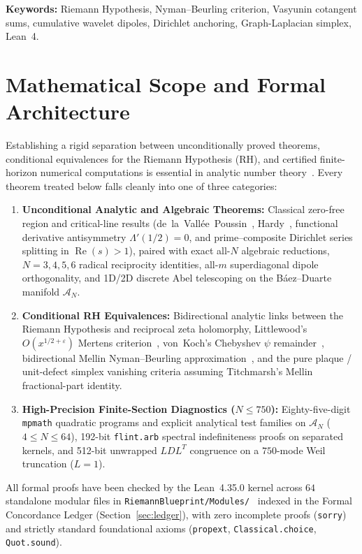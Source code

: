 \documentclass[11pt,a4paper]{article}
\theoremstyle{definition}
\begin{document}
\noindent\textbf{Keywords:} Riemann Hypothesis, Nyman--Beurling criterion, Vasyunin cotangent sums, cumulative wavelet dipoles, Dirichlet anchoring, Graph-Laplacian simplex, Lean~4.

\tableofcontents
\clearpage

\section{Mathematical Scope and Formal Architecture}\label{sec:intro}

Establishing a rigid separation between unconditionally proved theorems, conditional equivalences for the Riemann Hypothesis (RH), and certified finite-horizon numerical computations is essential in analytic number theory~\cite{Riemann1859,Titchmarsh1986}. Every theorem treated below falls cleanly into one of three categories:
\begin{enumerate}[leftmargin=1.8em,itemsep=2pt]
\item \textbf{Unconditional Analytic and Algebraic Theorems:} Classical zero-free region and critical-line results (de~la~Vall\'ee~Poussin~\cite{deLaValleePoussin1899}, Hardy~\cite{Hardy1914}, functional derivative antisymmetry $\Lambda'(1/2)=0$, and prime--composite Dirichlet series splitting in $\operatorname{Re}(s)>1$), paired with exact all-$N$ algebraic reductions, $N=3,4,5,6$ radical reciprocity identities, all-$m$ superdiagonal dipole orthogonality, and 1D/2D discrete Abel telescoping on the B\'aez--Duarte manifold $\mathcal{A}_N$.
\item \textbf{Conditional RH Equivalences:} Bidirectional analytic links between the Riemann Hypothesis and reciprocal zeta holomorphy, Littlewood's $O(x^{1/2+\varepsilon})$ Mertens criterion~\cite{Littlewood1912}, von~Koch's Chebyshev $\psi$ remainder~\cite{vonKoch1901}, bidirectional Mellin Nyman--Beurling approximation~\cite{Nyman1950,Beurling1955,BalazardSaiasYor1999}, and the pure plaque / unit-defect simplex vanishing criteria assuming Titchmarsh's Mellin fractional-part identity.
\item \textbf{High-Precision Finite-Section Diagnostics ($N \le 750$):} Eighty-five-digit \texttt{mpmath} quadratic programs and explicit analytical test families on $\mathcal{A}_N$ ($4 \le N \le 64$), 192-bit \texttt{flint.arb} spectral indefiniteness proofs on separated kernels, and 512-bit unwrapped $LDL^T$ congruence on a $750$-mode Weil truncation ($L=1$).
\end{enumerate}

All formal proofs have been checked by the Lean~4.35.0 kernel across $64$ standalone modular files in \texttt{RiemannBlueprint/Modules/}~\cite{deMouraUllrich2021,mathlibCommunity2020,MunawerRiemannBlueprint2026} indexed in the Formal Concordance Ledger (Section~\ref{sec:ledger}), with zero incomplete proofs (\texttt{sorry}) and strictly standard foundational axioms (\texttt{propext}, \texttt{Classical.choice}, \texttt{Quot.sound}).
\end{document}
